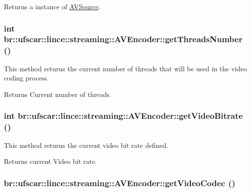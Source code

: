 \begin{DoxyReturn}{Returns}
a instance of \hyperlink{classbr_1_1ufscar_1_1lince_1_1streaming_1_1AVSource}{AVSource}. 
\end{DoxyReturn}
\hypertarget{classbr_1_1ufscar_1_1lince_1_1streaming_1_1AVEncoder_a5a8de8942a8ae3e4de6a175bd8b81bcb}{
\subsubsection[{getThreadsNumber}]{\setlength{\rightskip}{0pt plus 5cm}int br::ufscar::lince::streaming::AVEncoder::getThreadsNumber ()}}
\label{classbr_1_1ufscar_1_1lince_1_1streaming_1_1AVEncoder_a5a8de8942a8ae3e4de6a175bd8b81bcb}


This method returns the current number of threads that will be used in the video coding process. 

\begin{DoxyReturn}{Returns}
Current number of threads. 
\end{DoxyReturn}
\hypertarget{classbr_1_1ufscar_1_1lince_1_1streaming_1_1AVEncoder_af06bbe7c21183f6630ad5db9084a207e}{
\subsubsection[{getVideoBitrate}]{\setlength{\rightskip}{0pt plus 5cm}int br::ufscar::lince::streaming::AVEncoder::getVideoBitrate ()}}
\label{classbr_1_1ufscar_1_1lince_1_1streaming_1_1AVEncoder_af06bbe7c21183f6630ad5db9084a207e}


This method returns the current video bit rate defined. 

\begin{DoxyReturn}{Returns}
current Video bit rate. 
\end{DoxyReturn}
\hypertarget{classbr_1_1ufscar_1_1lince_1_1streaming_1_1AVEncoder_ae9454f52cc52685f1b0aa3308ddfa75c}{
\subsubsection[{getVideoCodec}]{ br::ufscar::lince::streaming::AVEncoder::getVideoCodec ()}}
\label{classbr_1_1ufscar_1_1lince_1_1streaming_1_1AVEncoder_ae9454f52cc52685f1b0aa3308ddfa75c}


